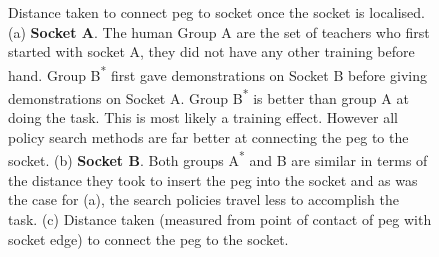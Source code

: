\begin{figure}
 \centering
  \caption{Distance taken to connect peg to socket once the socket is localised. (a) \textbf{Socket A}. The human 
  Group A are the set of teachers who first started with socket A, they did not have any other training before hand. Group 
  B\textsuperscript{*} first gave demonstrations on Socket B before giving demonstrations on Socket A. Group B\textsuperscript{*}
  is better than group A at doing the task. This is most likely a training effect. However all policy search methods are far better
  at connecting the peg to the socket. (b) \textbf{Socket B}. Both groups A\textsuperscript{*} and B are similar in terms 
  of the distance they took to insert the peg into the socket and as was the case for (a), the search policies travel less to accomplish 
  the task. (c) Distance taken (measured from point of contact of peg with socket edge) to connect the peg to the socket.  } 
  \label{fig:real_statistics}
\end{figure}

